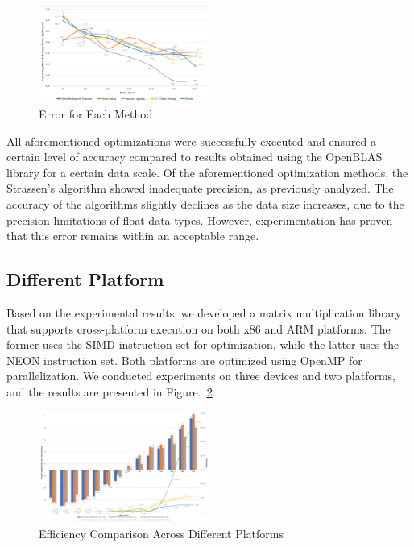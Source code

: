 \documentclass[conference]{IEEEtran}
\begin{document}
	\begin{figure}[htbp]
		\centerline{\includegraphics[width=0.5\textwidth]{fig10.png}}
		\caption{Error for Each Method}
		\label{fig::error}
	\end{figure}
	
	All aforementioned optimizations were successfully executed and ensured a certain level of accuracy compared to results obtained using the OpenBLAS library for a certain data scale. Of the aforementioned optimization methods, the Strassen's algorithm showed inadequate precision, as previously analyzed. The accuracy of the algorithms slightly declines as the data size increases, due to the precision limitations of float data types. However, experimentation has proven that this error remains within an acceptable range.
	
	\subsection{Different Platform}
	
	Based on the experimental results, we developed a matrix multiplication library that supports cross-platform execution on both x86 and ARM platforms. The former uses the SIMD instruction set for optimization, while the latter uses the NEON instruction set. Both platforms are optimized using OpenMP for parallelization. We conducted experiments on three devices and two platforms, and the results are presented in Figure.~\ref{fig::platform}.
	
	\begin{figure}[htbp]
		\centerline{\includegraphics[width=0.5\textwidth]{fig11.png}}
		\caption{Efficiency Comparison Across Different Platforms}
		\label{fig::platform}
	\end{figure}
\end{document}
